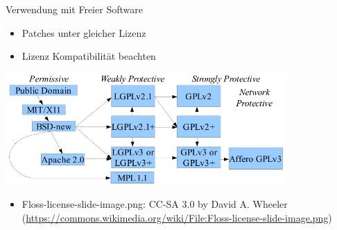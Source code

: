 \begin{frame}{Verwendung mit Freier Software}
	\pause
	\begin{itemize}
		\item Patches unter gleicher Lizenz
		\pause
		\item Lizenz Kompatibilität beachten
	\end{itemize}
	\pause
	\begin{center}
		\includegraphics[width=0.8\textwidth]{res/floss-license-compability.png}
	\end{center}
\end{frame}
\note
{
	\begin{itemize}
		\item Floss-license-slide-image.png: CC-SA 3.0 by David A. Wheeler (\url{https://commons.wikimedia.org/wiki/File:Floss-license-slide-image.png})
	\end{itemize}
}

